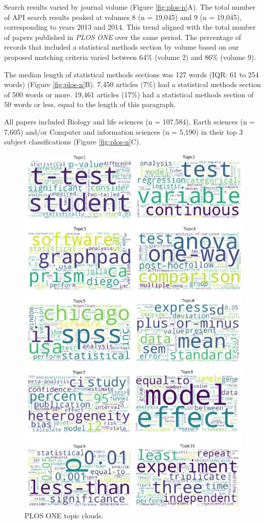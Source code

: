 \documentclass[12pt]{article}
\begin{document}
Search results varied by journal volume (Figure \ref{fig:plos-n}A). The
total number of API search results peaked at volumes 8 (n = 19,045) and
9 (n = 19,045), corresponding to years 2013 and 2014. This trend aligned
with the total number of papers published in \emph{PLOS ONE} over the
same period. The percentage of records that included a statistical
methods section by volume based on our proposed matching criteria varied
between 64\% (volume 2) and 86\% (volume 9).

The median length of statistical methods sections was 127 words (IQR: 61
to 254 words) (Figure \ref{fig:plos-n}B). 7,450 articles (7\%) had a
statistical methods section of 500 words or more. 19,461 articles (17\%)
had a statistical methods section of 50 words or less, equal to the
length of this paragraph.

All papers included Biology and life sciences (n = 107,584), Earth
sciences (n = 7,605) and/or Computer and information sciences (n =
5,190) in their top 3 subject classifications (Figure
\ref{fig:plos-n}C).

\begin{figure}

{\centering \includegraphics[width=0.7\linewidth]{figures/plos.wordclouds} 

}

\caption{PLOS ONE topic clouds.}\label{fig:unnamed-chunk-5}
\end{figure}
\end{document}
